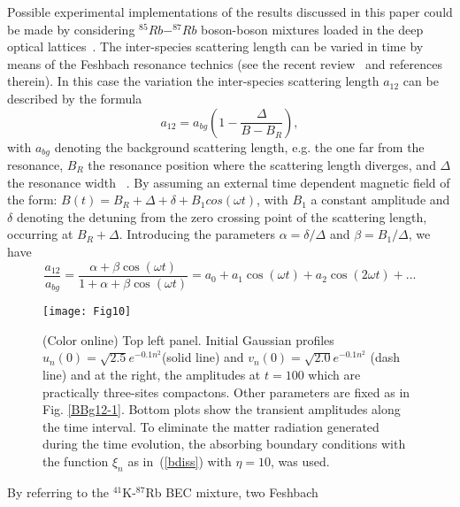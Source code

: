 \documentclass[12pt]{iopart}
\begin{document}
Possible experimental implementations of the results discussed in this paper  could be made
by considering $^{85}Rb-^{87}Rb$ boson-boson mixtures loaded in the deep optical lattices~\cite{Rapp,Thalhammer,Catani}. The inter-species scattering length can be varied in time by means of the Feshbach resonance technics (see the recent review~\cite{REV-MOD-PHYS} and references therein). In this case the variation the inter-species scattering length $a_{12}$
can be described by the formula
\begin{equation}
a_{12}=a_{bg}(1-\frac{\Delta}{B-B_{R}}),
\label{FR}
\end{equation}
with $a_{bg}$  denoting the background scattering length, e.g. the one far from the resonance, $B_{R}$ the resonance position where the scattering length diverges, and  $\Delta$ the resonance width~ \cite{REV-MOD-PHYS}.
By assuming an external  time dependent magnetic field of the form: $B(t)= B_R +\Delta + \delta + B_1 cos(\omega t)$, with $B_1$ a constant amplitude and  $\delta$ denoting the detuning from the zero crossing point of the scattering length, occurring at $B_R+\Delta$. Introducing the parameters $\alpha=\delta/\Delta$ and $\beta=B_1/\Delta$,  we have
\begin{equation}
\frac{a_{12}}{a_{bg}}=\frac{\alpha + \beta \cos(\omega t)}{1 + \alpha + \beta \cos(\omega t)} = a_0 + a_1\cos(\omega t)+ a_2\cos(2\omega t) +...
\label{Fourier}
\end{equation}
%
\begin{figure}
\centerline{\texttt{[image: Fig10]}}\caption{(Color online) Top left panel. Initial Gaussian
profiles $u_{n}(0)=\sqrt{2.5}e^{-0.1n^{2}}$(solid line) and $v_{n}(0)=\sqrt{2.0}e^{-0.1n^{2}}$
(dash line) and at the right, the amplitudes at $t=100$ which are
practically three-sites compactons. Other parameters are fixed as
in Fig. \ref{BBg12-1}. Bottom plots show the transient amplitudes
along the time interval. To eliminate the matter radiation generated during the time evolution, the absorbing boundary conditions with the function $\xi_n$ as in~(\ref{bdiss}) with $\eta=10$, was used.}
\label{Addition4}
\end{figure}
%
By referring to the $^{41}$K-$^{87}$Rb BEC mixture, two Feshbach
\end{document}
